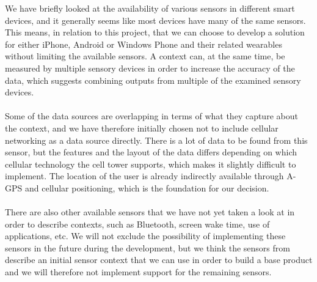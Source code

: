 We have briefly looked at the availability of various sensors in different smart devices, and it generally seems like most devices have many of the same sensors. This means, in relation to this project, that we can choose to develop a solution for either iPhone, Android or Windows Phone and their related wearables without limiting the available sensors. A context can, at the same time, be measured by multiple sensory devices in order to increase the accuracy of the data, which suggests combining outputs from multiple of the examined sensory devices. 
\\\\
Some of the data sources are overlapping in terms of what they capture about the context, and we have therefore initially chosen not to include cellular networking as a data source directly. There is a lot of data to be found from this sensor, but the features and the layout of the data differs depending on which cellular technology the cell tower supports, which makes it slightly difficult to implement. The location of the user is already indirectly available through A-GPS and cellular positioning, which is the foundation for our decision.
\\\\
There are also other available sensors that we have not yet taken a look at in order to describe contexts, such as Bluetooth, screen wake time, use of applications, etc. We will not exclude the possibility of implementing these sensors in the future during the development, but we think the sensors from  describe an initial sensor context that we can use in order to build a base product and we will therefore not implement support for the remaining sensors.